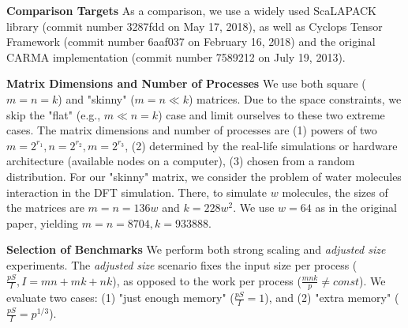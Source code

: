 \documentclass[sigplan,review,anonymous,10pt]{acmart}\settopmatter{printfolios=true,printccs=false,printacmref=false}
\newcommand\mac[1]{\textcolor{red}{[Mac: #1]}}
\newcommand{\macb}[1]{\textbf{\textsf{#1}}}
\begin{document}

\macb{Comparison Targets}
%
As a comparison, we use a widely used ScaLAPACK library (commit number 3287fdd 
on May 17, 2018), as well 
as Cyclops Tensor Framework (commit number 6aaf037 on February 16, 2018) and 
the original CARMA implementation (commit number 7589212 on July 19, 2013).

\macb{Matrix Dimensions and Number of Processes}
We use both square ($m = n = k$) and "skinny" ($m = n \ll k$) matrices. Due to 
the space constraints, we skip the "flat" (e.g., $m \ll n = k$) case and limit 
ourselves to these two extreme cases. The matrix dimensions and number of 
processes are (1) powers of 
two $m = 2^{r_1}, n = 2^{r_2}, m = 2^{r_3}$, (2) determined by the real-life 
simulations or hardware architecture (available nodes on a computer), (3) 
chosen from a random distribution. 
For our "skinny" matrix, we consider the problem of 
water 
molecules interaction in the DFT
simulation\cite{joost}. There, to simulate $w$ molecules, the sizes 
of the 
matrices are $m=n=136w$ and $k = 228w^2$. We use $w=64$ as in the 
original paper, yielding $m=n=8704, k = 933888$.

\macb{Selection of Benchmarks}
%
We perform both strong scaling and \emph{adjusted size} experiments. 
The \emph{adjusted size} scenario fixes the input size per process 
($\frac{pS}{I}, I = mn + mk + nk$), as opposed to the work per 
process ($\frac{mnk}{p} \ne const$). We evaluate two cases: (1) "just enough 
memory" ($\frac{pS}{I} = 1$), and (2) "extra memory"  ($\frac{pS}{I} = 
p^{1/3}$).
%
%
%
\end{document}
